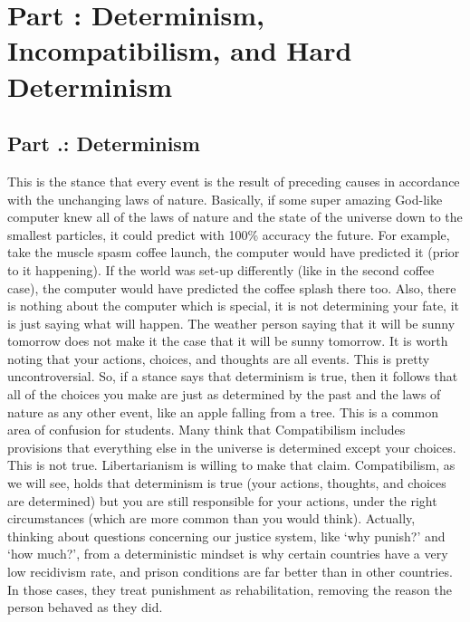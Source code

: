 \chapter{Part \thechapcount: Determinism, Incompatibilism, and Hard Determinism}\setcounter{seccount}{1}
\section{Part \thechapcount.\theseccount:  Determinism}

This is the stance that every event is the result of preceding causes in accordance with the unchanging laws of nature. Basically, if some super amazing God-like computer knew all of the laws of nature and the state of the universe down to the smallest particles, it could predict with 100\% accuracy the future. For example, take the muscle spasm coffee launch, the computer would have predicted it (prior to it happening). If the world was set-up differently (like in the second coffee case), the computer would have predicted the coffee splash there too. Also, there is nothing about the computer which is special, it is not determining your fate, it is just saying what will happen. The weather person saying that it will be sunny tomorrow does not make it the case that it will be sunny tomorrow. It is worth noting that your actions, choices, and thoughts are all events. This is pretty uncontroversial. So, if a stance says that determinism is true, then it follows that all of the choices you make are just as determined by the past and the laws of nature as any other event, like an apple falling from a tree. This is a common area of confusion for students. Many think that Compatibilism includes provisions that everything else in the universe is determined except your choices. This is not true. Libertarianism is willing to make that claim. Compatibilism, as we will see, holds that determinism is true (your actions, thoughts, and choices are determined) but you are still responsible for your actions, under the right circumstances (which are more common than you would think).  Actually, thinking about questions concerning our justice system, like `why punish?' and `how much?', from a deterministic mindset is why certain countries have a very low recidivism rate, and prison conditions are far better than in other countries. In those cases, they treat punishment as rehabilitation, removing the reason the person behaved as they did. 

